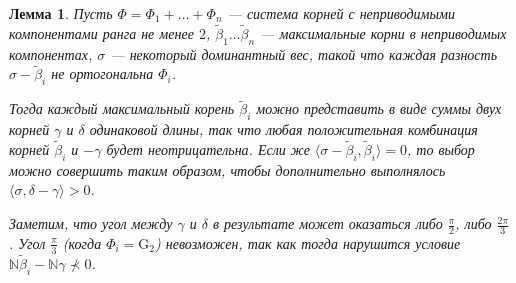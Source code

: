 \documentclass[12pt]{matmex-diploma}
\theoremstyle{mystyleni}
\theoremstyle{mystyle}
\newtheorem{lm}{Лемма}
\newcommand{\N}{\mathbb{N}}
\begin{document}
\begin{lm}\label{maxrootsum}
Пусть $\Phi=\Phi_1+\ldots+\Phi_n$ --- система корней с неприводимыми компонентами ранга не менее $2$, $\widetilde\beta_1 \ldots \widetilde\beta_n$ ---  максимальные корни в неприводимых компонентах, $\sigma$ --- некоторый доминантный вес, такой что каждая разность $\sigma-\widetilde\beta_i$ не ортогональна $\Phi_i$.

Тогда каждый максимальный корень $\widetilde\beta_i$ можно представить в виде суммы двух корней $\gamma$ и $\delta$ одинаковой длины, так что любая положительная комбинация корней $\widetilde\beta_i$ и $-\gamma$ будет неотрицательна. Если же $\langle\sigma-\widetilde\beta_i,\widetilde\beta_i\rangle=0$, то выбор можно совершить таким образом, чтобы дополнительно выполнялось $\langle\sigma,\delta-\gamma\rangle>0$.

Заметим, что угол между $\gamma$ и $\delta$ в результате может оказаться либо $\frac{\pi}{2}$, либо $\frac{2\pi}{3}$. Угол $\frac{\pi}{3}$ (когда $\Phi_i = \mathrm{G}_2$) невозможен, так как тогда нарушится условие $\N\widetilde\beta_i-\N\gamma \nprec 0$.
\end{lm}
\end{document}
